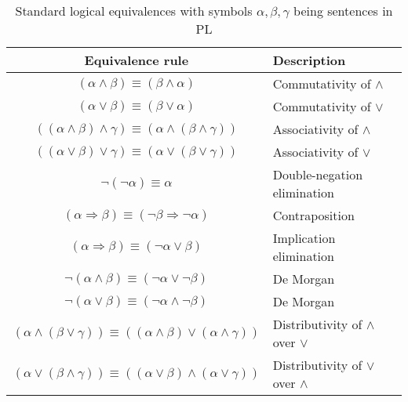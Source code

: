 \begin{table}[H]
  \centering
  \begin{tabular}{cl}
    \toprule
    \textbf{Equivalence rule}  \hspace{1cm}   & \textbf{Description}  \\
    \toprule
  
    
    $(\alpha \wedge \beta) \equiv (\beta \wedge \alpha)$  & Commutativity of $\wedge$ \\
    $(\alpha \vee \beta) \equiv (\beta \vee \alpha)$  & Commutativity of $\vee$ \\
    $((\alpha \wedge \beta) \wedge \gamma) \equiv (\alpha \wedge (\beta \wedge \gamma)) $  & Associativity of $\wedge$ \\
    $((\alpha \vee \beta) \vee \gamma) \equiv (\alpha \vee (\beta \vee \gamma)) $  & Associativity of $\vee$ \\
    $\neg(\neg \alpha) \equiv \alpha$ & Double-negation elimination \\
    $(\alpha \Rightarrow \beta) \equiv (\neg \beta \Rightarrow \neg \alpha)$ & Contraposition\\
    $(\alpha \Rightarrow \beta) \equiv (\neg \alpha \vee \beta)$ & Implication elimination\\
    $\neg(\alpha \wedge \beta) \equiv (\neg \alpha \vee \neg \beta)$ & De Morgan \\ 
    $\neg(\alpha \vee \beta) \equiv (\neg \alpha \wedge \neg \beta)$& De Morgan\\
	$(\alpha \wedge (\beta \vee \gamma)) \equiv ((\alpha \wedge \beta) \vee (\alpha \wedge \gamma)) $  & Distributivity of $\wedge$ over $\vee$ \\
	$(\alpha \vee (\beta \wedge \gamma))  \equiv ((\alpha \vee \beta) \wedge (\alpha \vee \gamma)) $  & Distributivity of $\vee$ over $\wedge$ \\
   	 
   	 
    \bottomrule
  \end{tabular}
  \caption{Standard logical equivalences with symbols $\alpha,\beta,\gamma$ being sentences in PL}
  \label{table:logical_equivalences}
\end{table}



